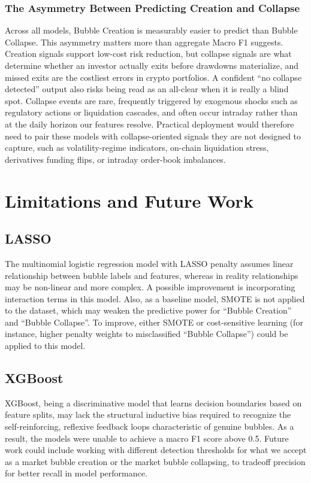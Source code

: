 \documentclass[12pt,a4paper]{article}
\begin{document}
\subsubsection{The Asymmetry Between Predicting Creation and Collapse}

Across all models, Bubble Creation is measurably easier to predict than Bubble Collapse. This asymmetry matters more than aggregate Macro F1 suggests. Creation signals support low-cost risk reduction, but collapse signals are what determine whether an investor actually exits before drawdowns materialize, and missed exits are the costliest errors in crypto portfolios. A confident ``no collapse detected'' output also risks being read as an all-clear when it is really a blind spot. Collapse events are rare, frequently triggered by exogenous shocks such as regulatory actions or liquidation cascades, and often occur intraday rather than at the daily horizon our features resolve. Practical deployment would therefore need to pair these models with collapse-oriented signals they are not designed to capture, such as volatility-regime indicators, on-chain liquidation stress, derivatives funding flips, or intraday order-book imbalances.

\section{Limitations and Future Work}

\subsection{LASSO}
The multinomial logistic regression model with LASSO penalty assumes linear relationship between bubble labels and features, whereas in reality relationships may be non-linear and more complex. A possible improvement is incorporating interaction terms in this model.
Also, as a baseline model, SMOTE is not applied to the dataset, which may weaken the predictive power for “Bubble Creation” and “Bubble Collapse”. To improve, either SMOTE or cost-sensitive learning (for instance, higher penalty weights to misclassified “Bubble Collapse”) could be applied to this model.

\subsection{XGBoost}
XGBoost, being a discriminative model that learns decision boundaries based on feature splits, may lack the structural inductive bias required to recognize the self-reinforcing, reflexive feedback loops characteristic of genuine bubbles. As a result, the models were unable to achieve a macro F1 score above 0.5. Future work could include working with different detection thresholds for what we accept as a market bubble creation or the market bubble collapsing, to tradeoff precision for better recall in model performance. 
\end{document}
